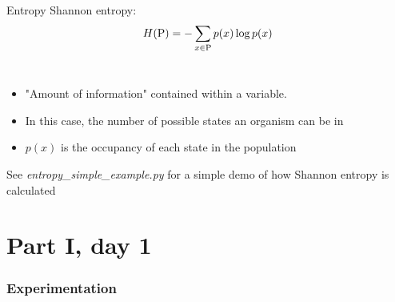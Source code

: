 \documentclass[10pt,aspectratio=169]{beamer}
\begin{document}
\begin{frame}{Entropy}
		Shannon entropy:
$$
H({\rm P}) = -\sum_{x \in {\rm P}} p(x)\log p(x)
\label{eq:shannon-entropy-def}
$$
		\\
		\medskip
		\begin{itemize}
			\item "Amount of information" contained within
                          a variable.
			\item In this case, the number of possible states an organism can be in
			\item $p(x)$ is the occupancy of each state in the population
		\end{itemize}
		\bigskip
		See \emph{entropy\_simple\_example.py} for a simple
                demo of how Shannon entropy is calculated
\end{frame}

\part{Part I, day 1}

\section{Experimentation}
\end{document}
